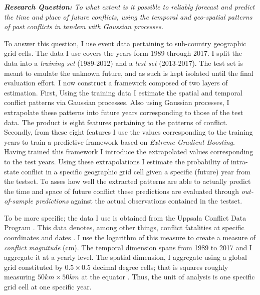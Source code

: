 \documentclass[a4paper]{article}
\begin{document}





\begin{displayquote}

\emph{\textbf{Research Question:} To what extent is it possible to reliably forecast and predict the time and place of future conflicts, using the temporal and geo-spatial patterns of past conflicts in tandem with Gaussian processes.}\par

\end{displayquote}

To answer this question, I use event data pertaining to sub-country geographic grid cells. The data I use covers the years form 1989 through 2017. I split the data into a \emph{training set} (1989-2012) and a \emph{test set} (2013-2017). The test set is meant to emulate the unknown future, and as such is kept isolated until the final evaluation effort. I now construct a framework composed of two layers of estimation. First, Using the training data I estimate the spatial and temporal conflict patterns via Gaussian processes. Also using Gaussian processes, I extrapolate these patterns into future years corresponding to those of the test data. The product is eight features pertaining to the patterns of conflict. Secondly, from these eight features I use the values corresponding to the training years to train a predictive framework based on \emph{Extreme Gradient Boosting}. Having trained this framework I introduce the extrapolated values corresponding to the test years. Using these extrapolations I estimate the probability of intra-state conflict in a specific geographic grid cell given a specific (future) year from the testset. To asses how well the extracted patterns are able to actually predict the time and space of future conflict these predictions are evaluated through \emph{out-of-sample predictions} against the actual observations contained in the testset.\par

To be more specific; the data I use is obtained from the Uppsala Conflict Data Program \citep{UCDP_2017}. This data denotes, among other things, conflict fatalities at specific coordinates and dates \citep{UCDP_2017}. I use the logarithm of this measure to create a measure of \emph{conflict magnitude} (cm). The temporal dimension spans from 1989 to 2017 and I aggregate it at a yearly level. The spatial dimension, I aggregate using a global grid constituted by $0.5 \times 0.5$ decimal degree cells; that is squares roughly measuring $50km\times50km$ at the equator \citep[367]{Tollefsen_2012}. Thus, the unit of analysis is one specific grid cell at one specific year.\par
\end{document}
